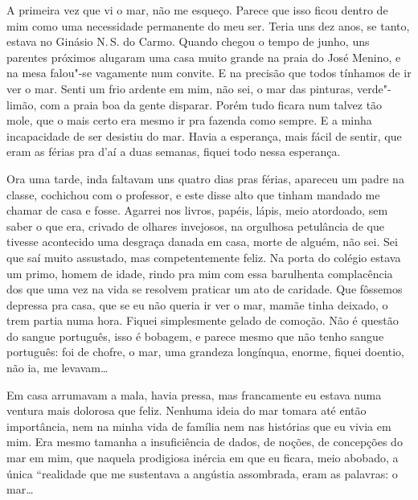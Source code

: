 A primeira vez que vi o mar, não me esqueço. Parece que isso ficou
dentro de mim como uma necessidade permanente do meu ser. Teria uns dez
anos, se tanto, estava no Ginásio N.\,S. do Carmo. Quando chegou o tempo
de junho, uns parentes próximos alugaram uma casa muito grande na praia
do José Menino, e na mesa falou"-se vagamente num convite. E na precisão
que todos tínhamos de ir ver o mar. Senti um frio ardente em mim, não
sei, o mar das pinturas, verde"-limão, com a praia boa da gente disparar.
Porém tudo ficara num talvez tão mole, que o mais certo era mesmo ir pra
fazenda como sempre. E a minha incapacidade de ser desistiu do mar.
Havia a esperança, mais fácil de sentir, que eram as férias pra d'aí a
duas semanas, fiquei todo nessa esperança.

Ora uma tarde, inda faltavam uns quatro dias pras férias, apareceu um
padre na classe, cochichou com o professor, e este disse alto que tinham
mandado me chamar de casa e fosse. Agarrei nos livros, papéis, lápis,
meio atordoado, sem saber o que era, crivado de olhares invejosos, na
orgulhosa petulância de que tivesse acontecido uma desgraça danada em
casa, morte de alguém, não sei. Sei que saí muito assustado, mas
competentemente feliz. Na porta do colégio estava um primo, homem de
idade, rindo pra mim com essa barulhenta complacência dos que uma vez na
vida se resolvem praticar um ato de caridade. Que fôssemos depressa pra
casa, que se eu não queria ir ver o mar, mamãe tinha deixado, o trem
partia numa hora. Fiquei simplesmente gelado de comoção. Não é questão
do sangue português, isso é bobagem, e parece mesmo que não tenho sangue
português: foi de chofre, o mar, uma grandeza longínqua, enorme, fiquei
doentio, não ia, me levavam\ldots{}

Em casa arrumavam a mala, havia pressa, mas francamente eu estava numa
ventura mais dolorosa que feliz. Nenhuma ideia do mar tomara até então
importância, nem na minha vida de família nem nas histórias que eu vivia
em mim. Era mesmo tamanha a insuficiência de dados, de noções, de
concepções do mar em mim, que naquela prodigiosa inércia em que eu
ficara, meio abobado, a única ``realidade que me sustentava a angústia
assombrada, eram as palavras: o mar\ldots{}

